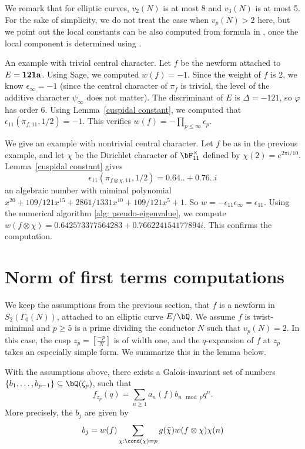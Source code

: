 \documentclass [11pt, proquest] {uwthesis}[2015/03/03]
\begin{document}
We remark that for elliptic curves, $v_2(N)$ is at most 8 and $v_3(N)$ is at most 5. For the sake of simplicity, we do not treat the case when $v_p(N) > 2$ here, but we point out the local constants can be  also computed from formula in \cite{bushnell2006local}, 
once the local component is determined using \cite{loeffler2010computation}. 

\begin{Example}
An example with trivial central character.  Let $f$ be the newform attached to $E = \bf{121a}$. Using Sage, we computed $w(f) = -1$. Since the weight of $f$ is 2, we know $\epsilon_\infty = -1$ (since the central character of $\pi_f$ is trivial, the level of the additive character $\psi_\infty$ does not matter). The discriminant of $E$ is $\Delta = -121$, so $\varphi$ has order 6. Using Lemma~\ref{cuspidal constant}, we computed that
$\epsilon_{11}(\pi_{f,11}, 1/2) = -1$. This verifies $w(f) = - \prod_{p \leq \infty} \epsilon_p$. 
\end{Example}

\begin{Example}
We give an example with nontrivial central character. Let $f$ be as in the previous example, and let $\chi$ be the Dirichlet character of $\bF_{11}^{\times}$ defined by $\chi(2) = e^{2\pi i /10}$. Lemma~\ref{cuspidal constant} gives 
\[
	\epsilon_{11}(\pi_{f \otimes \chi,11}, 1/2) = 0.64..+0.76..i
\]
an algebraic number with miminal polynomial $x^{20} + 109/121 x^15 + 2861/1331 x^10 + 109/121x^5 + 1$.
So $w = - \epsilon_{11} \epsilon_\infty = \epsilon_{11}$. Using the numerical algorithm \ref{alg: pseudo-eigenvalue},
we compute $w(f \otimes \chi) = 0.642573377564283 + 0.766224154177894i$. This confirms the computation. 
\end{Example}


\section{Norm of first terms computations}

We keep the assumptions from the previous section, that $f$ is a newform in $S_2(\Gamma_0(N))$, attached to an elliptic curve $E/\bQ$. We assume $f$ is twist-minimal and $p \geq 5$ is a prime dividing the conductor $N$ such that 
$v_p(N) = 2$.  In this case, the cusp $z_p = \left[\frac{-p}{N} \right]$ is of width one, and the $q$-expansion of $f$ at $z_p$
takes an especially simple form.  We summarize this in the lemma below. 
\begin{Lemma}
With the assumptions above, there exists a Galois-invariant set of numbers $\{b_1, \ldots, b_{p-1}\} \subseteq \bQ(\zeta_p)$, such that 
\[
	f_{z_p}(q) = \sum_{n \geq 1} a_n(f) b_{n\mod{p}} q^n. 
\]
More precisely, the $b_j$ are given by 
\[
 b_j = w(f) \sum_{\chi: \cond(\chi) = p} g(\bar{\chi}) w(f\otimes \chi) \chi(n)
\]
\end{Lemma}
\end{document}
